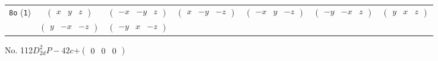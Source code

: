 \documentclass[fleqn,9pt,landscape]{jsarticle}
\begin{document}
\begin{center}
\begin{longtable}{ccccccc}
{\tt 8o} ({\tt 1}) & $ \begin{pmatrix} x & y & z \end{pmatrix} $ & $ \begin{pmatrix} - x & - y & z \end{pmatrix} $ & $ \begin{pmatrix} x & - y & - z \end{pmatrix} $ & $ \begin{pmatrix} - x & y & - z \end{pmatrix} $ & $ \begin{pmatrix} - y & - x & z \end{pmatrix} $ & $ \begin{pmatrix} y & x & z \end{pmatrix} $ \\
& $ \begin{pmatrix} y & - x & - z \end{pmatrix} $ & $ \begin{pmatrix} - y & x & - z \end{pmatrix} $ & $  $ & $  $ & $  $ & $  $ \\
\end{longtable}
\end{center}
\newpage
No. 112\quad$D_{2d}^{2}$\quad$P-42c$\quad[ tetragonal ]\quad$+\begin{pmatrix} 0 & 0 & 0 \end{pmatrix}$
\end{document}
